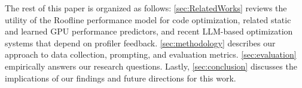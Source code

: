 \begin{itemize}
    
\end{itemize}

The rest of this paper is organized as follows:
\autoref{sec:RelatedWorks} reviews the utility of the Roofline performance model for code optimization, related static and learned GPU performance predictors, and recent LLM-based optimization systems that depend on profiler feedback.
\autoref{sec:methodology} describes our approach to data collection, prompting, and evaluation metrics.
\autoref{sec:evaluation} empirically answers our research questions.
Lastly, \autoref{sec:conclusion} discusses the implications of our findings and future directions for this work.


